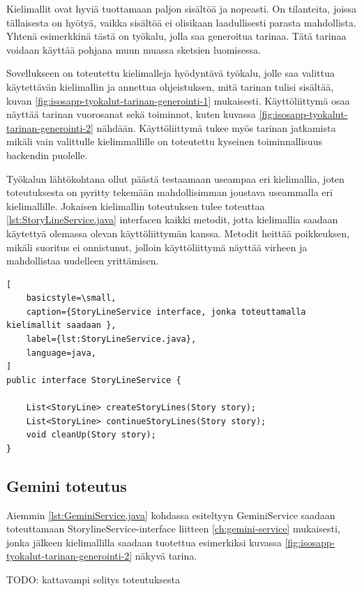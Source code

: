 Kielimallit ovat hyviä tuottamaan paljon sisältöä ja nopeasti. On tilanteita,
joissa tällaisesta on hyötyä, vaikka sisältöä ei olisikaan laadullisesti
parasta mahdollista. Yhtenä esimerkkinä tästä on työkalu, jolla saa generoitua
tarinaa. Tätä tarinaa voidaan käyttää pohjana muun muassa sketsien luomisessa.

Sovellukseen on toteutettu kielimalleja hyödyntävä työkalu, jolle saa valittua
käytettävän kielimallin ja annettua ohjeistuksen, mitä tarinan tulisi sisältää,
kuvan \ref{fig:isosapp-tyokalut-tarinan-generointi-1} mukaisesti.
Käyttöliittymä osaa näyttää tarinan vuorosanat sekä toiminnot, kuten kuvassa
\ref{fig:isosapp-tyokalut-tarinan-generointi-2} nähdään. Käyttöliittymä tukee
myös tarinan jatkamista mikäli vain valittulle kielimmallille on toteutettu
kyseinen toiminnallisuus backendin puolelle.

Työkalun lähtökohtana ollut päästä testaamaan useampaa eri kielimallia, joten
toteutuksesta on pyritty tekemään mahdollisimman joustava useammalla eri
kielimallille. Jokaisen kielimallin toteutuksen tulee toteuttaa
\ref{lst:StoryLineService.java} interfacen kaikki metodit, jotta kielimallia
saadaan käytettyä olemassa olevan käyttöliittymän kanssa. Metodit heittää
poikkeuksen, mikäli suoritus ei onnistunut, jolloin käyttöliittymä näyttää
virheen ja mahdollistaa uudelleen yrittämisen.

\clearpage
\begin{lstlisting}[
    basicstyle=\small,
    caption={StoryLineService interface, jonka toteuttamalla kielimallit saadaan },
    label={lst:StoryLineService.java},
    language=java,
]
public interface StoryLineService {

    List<StoryLine> createStoryLines(Story story);
    List<StoryLine> continueStoryLines(Story story);
    void cleanUp(Story story);
}
\end{lstlisting}

\subsection{Gemini toteutus}

Aiemmin \ref{lst:GeminiService.java} kohdassa esiteltyyn GeminiService saadaan
toteuttamaan StorylineService-interface liitteen \ref{ch:gemini-service}
mukaisesti, jonka jälkeen kielimallilla saadaan tuotettua esimerkiksi kuvassa
\ref{fig:isosapp-tyokalut-tarinan-generointi-2} näkyvä tarina.

TODO: kattavampi selitys toteutuksesta

